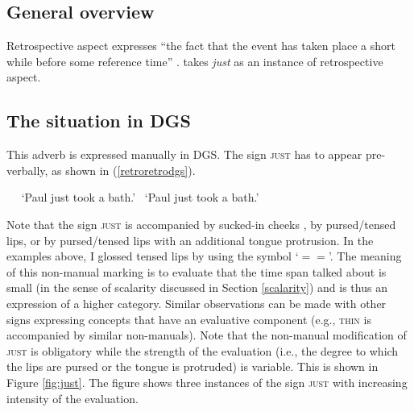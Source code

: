 \subsection{General overview}
Retrospective aspect expresses ``the fact that the event has taken place a short while before some reference time'' \citep[96]{cinque1999adverbs}. \citet{cinque1999adverbs} takes \textit{just} as an instance of retrospective aspect. 

\subsection{The situation in DGS}
This adverb is expressed manually in DGS. The sign \textsc{just} has to appear pre-verbally, as shown in (\ref{retroretrodgs}).


\begin{exe}

\ex\label{retroretrodgs}\begin{xlist} 
\ex \textcolor{white}{*}  
%
\glt \textcolor{white}{*}`Paul just took a bath.' \label{ex:retrospectivea}
\ex *  
%
\glt \textcolor{white}{*}`Paul just took a bath.' \label{ex:retrospectiveb}
\end{xlist}
\end{exe} 


\noindent Note that the sign \textsc{just} is accompanied by sucked-in cheeks \citep[40]{herrmann2013modal}, by pursed/tensed lips, or by pursed/tensed lips with an additional tongue protrusion. In the examples above, I glossed tensed lips by using the symbol `$= =$'. The meaning of this non-manual marking is to evaluate that the time span talked about is small (in the sense of scalarity discussed in Section \ref{scalarity}) and is thus an expression of a higher category. Similar observations can be made with other signs expressing concepts that have an evaluative component (e.g., \textsc{thin} is accompanied by similar non-manuals). Note that the non-manual modification of \textsc{just} is obligatory while the strength of the evaluation (i.e., the degree to which the lips are pursed or the tongue is protruded) is variable. This is shown in Figure \ref{fig:just}. The figure shows three instances of the sign \textsc{just} with increasing intensity of the evaluation. 

